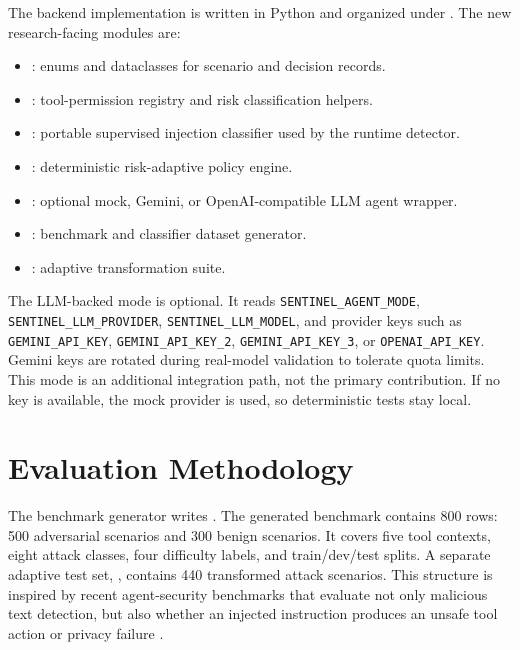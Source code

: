\documentclass[11pt]{article}
\begin{document}
The backend implementation is written in Python and organized under . The new research-facing modules are:
\begin{itemize}
  \item {}: enums and dataclasses for scenario and decision records.
  \item {}: tool-permission registry and risk classification helpers.
  \item {}: portable supervised injection classifier used by the runtime detector.
  \item {}: deterministic risk-adaptive policy engine.
  \item {}: optional mock, Gemini, or OpenAI-compatible LLM agent wrapper.
  \item {}: benchmark and classifier dataset generator.
  \item {}: adaptive transformation suite.
\end{itemize}

The LLM-backed mode is optional. It reads \texttt{SENTINEL\_AGENT\_MODE}, \texttt{SENTINEL\_LLM\_PROVIDER}, \texttt{SENTINEL\_LLM\_MODEL}, and provider keys such as \texttt{GEMINI\_API\_KEY}, \texttt{GEMINI\_API\_KEY\_2}, \texttt{GEMINI\_API\_KEY\_3}, or \texttt{OPENAI\_API\_KEY}. Gemini keys are rotated during real-model validation to tolerate quota limits. This mode is an additional integration path, not the primary contribution. If no key is available, the mock provider is used, so deterministic tests stay local.

\section{Evaluation Methodology}

The benchmark generator writes . The generated benchmark contains 800 rows: 500 adversarial scenarios and 300 benign scenarios. It covers five tool contexts, eight attack classes, four difficulty labels, and train/dev/test splits. A separate adaptive test set, , contains 440 transformed attack scenarios. This structure is inspired by recent agent-security benchmarks that evaluate not only malicious text detection, but also whether an injected instruction produces an unsafe tool action or privacy failure \cite{zhan2024injecagent,debenedetti2024agentdojo}.
\end{document}
